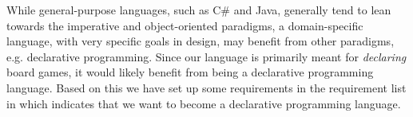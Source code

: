 While general-purpose languages, such as C\# and Java, generally tend to lean towards the imperative and object-oriented paradigms, a domain-specific language, with very specific goals in design, may benefit from other paradigms, e.g. declarative programming. Since our language is primarily meant for {\em declaring} board games, it would likely benefit from being a declarative programming language. Based on this we have set up some requirements in the requirement list in  which indicates that we want \productname{} to become a declarative programming language.  

